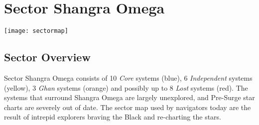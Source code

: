 
\section{Sector Shangra Omega}
\label{sec:sector}

\begin{center}
  \texttt{[image: sectormap]}
\end{center}

\newpage

\begin{multicols}{2}

  \subsection{Sector Overview}

  Sector Shangra Omega consists of 10 \textit{Core} systems (blue), 6 \textit{Independent} systems (yellow), 3 \textit{Ghan} systems (orange) and possibly up to 8 \textit{Lost} systems (red). The systems that surround Shangra Omega are largely unexplored, and Pre-Surge star charts are severely out of date. The sector map used by navigators today are the result of intrepid explorers braving the Black and re-charting the stars.
  

\end{multicols}
